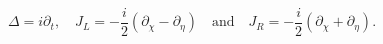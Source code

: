 \begin{equation}
\Delta = i \partial_t, \quad
J_L = -\frac{i}{2} \left( \partial_{\chi} - \partial_{\eta} \right) \quad
\textrm{and} \quad
J_R = -\frac{i}{2} \left( \partial_{\chi} + \partial_{\eta} \right).
\end{equation}

